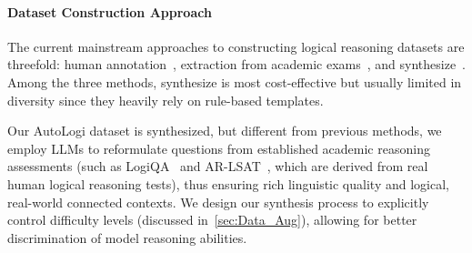 \paragraph{Dataset Construction Approach}
The current mainstream approaches to constructing logical reasoning datasets are threefold: %
human annotation~\cite{clark2020transformerssoftreasonerslanguage,ismayilzada2023crowbenchmarkingcommonsensereasoning,han2024folionaturallanguagereasoning}, extraction from academic exams~\cite{liu2020logiqachallengedatasetmachine,bansal2023fewshotunifiedquestionanswering,zhong2021ar}, and synthesize~\cite{saparov2022language, sinha-etal-2019-clutrr, white2024livebench}.
%
Among the three methods, synthesize is most cost-effective but usually limited in diversity since they heavily rely on rule-based templates.




Our AutoLogi dataset is synthesized, but different from previous methods, we employ LLMs to reformulate questions from established academic reasoning assessments (such as LogiQA~\cite{liu2020logiqachallengedatasetmachine} and AR-LSAT~\cite{zhong2021ar}, which are derived from real human logical reasoning tests), thus ensuring rich linguistic quality and logical, real-world connected contexts. We design our synthesis process to explicitly control difficulty levels (discussed in~\ref{sec:Data_Aug}), allowing for better discrimination of model reasoning abilities. %

